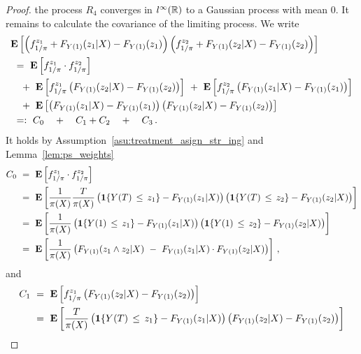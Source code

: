 \begin{proof}
the process $R_4$ converges in $l^\infty(\mathbb{R})$ to a Gaussian process with mean 0.
It remains to calculate the covariance of the limiting process.
We write
\begin{align*}
  &
  \E
  \left[
  \left( 
  f^{z_1}_{1/\pi}
  +
  F_{Y(1)}(z_1|X)
  -
F_{Y(1)}(z_1)
  \right)
  \left( 
  f^{z_2}_{1/\pi}
  +
  F_{Y(1)}(z_2|X)
  -
F_{Y(1)}(z_2)
  \right)
  \right]
  \\
  &
  \ 
  =
  \ 
\E
\left[
  f^{z_1}_{1/\pi}
  \cdot
  f^{z_2}_{1/\pi}
\right]
\\
  &
  \quad
  +
  \ 
  \E
  \left[
  f^{z_1}_{1/\pi}
  \left( 
  F_{Y(1)}(z_2|X)
  -
F_{Y(1)}(z_2)
  \right)
  \right]
  \ 
  +
  \ 
  \E
  \left[
  f^{z_2}_{1/\pi}
  \left( 
  F_{Y(1)}(z_1|X)
  -
F_{Y(1)}(z_1)
  \right)
  \right]
  \\
  &
  \quad
  +
  \ 
  \E
  \left[
  \left( 
  F_{Y(1)}(z_1|X)
  -
F_{Y(1)}(z_1)
  \right)
  \left( 
  F_{Y(1)}(z_2|X)
  -
F_{Y(1)}(z_2)
  \right)
  \right]
  \\
  &
  \ 
  =:
  \ 
  C_0
  \quad 
  +
  \quad 
  C_1
  +
  C_2
  \quad 
  +
  \quad 
  C_3
  \,.
\end{align*}
It holds
by Assumption~\eqref{asu:treatment_asign_str_ing} and Lemma~\ref{lem:ps_weights}
\begin{align*}
  C_0 
  &
  \ 
  =
  \ 
\E
\left[
  f^{z_1}_{1/\pi}
  \cdot
  f^{z_2}_{1/\pi}
\right]
\\
&
\ 
=
\ 
\E
\left[
\frac{1}{\pi(X)}
\frac{T}{\pi(X)}
\left( 
\mathbf{1}{\left\{ Y(T)\,\le\, z_1 \right\}}
-
F_{Y(1)}(z_1|X)
\right)
\left( 
\mathbf{1}{\left\{ Y(T)\,\le\, z_2 \right\}}
-
F_{Y(1)}(z_2|X)
\right)
\right]
\\
&
\ 
=
\ 
\E
\left[
\frac{1}{\pi(X)}
\left( 
\mathbf{1}{\left\{ Y(1)\,\le\, z_1 \right\}}
-
F_{Y(1)}(z_1|X)
\right)
\left( 
\mathbf{1}{\left\{ Y(1)\,\le\, z_2 \right\}}
-
F_{Y(1)}(z_2|X)
\right)
\right]
\\
&
\ 
=
\ 
\E
\left[
\frac{1}{\pi(X)}
\left( 
F_{Y(1)}(z_1\land z_2|X)
\ 
-
\ 
F_{Y(1)}(z_1|X)
\cdot
F_{Y(1)}(z_2|X)
\right)
\right]
\,,
\end{align*}
and
\begin{align*}
  C_1
  &
  \ 
  =
  \ 
 \E
  \left[
  f^{z_1}_{1/\pi}
  \left( 
  F_{Y(1)}(z_2|X)
  -
F_{Y(1)}(z_2)
  \right)
  \right]
  \\
  &
  \ 
  =
  \ 
 \E
  \left[
\frac{T}{\pi(X)}
\left( 
\mathbf{1}{\left\{ Y(T)\,\le\, z_1 \right\}}
-
F_{Y(1)}(z_1|X)
\right)
  \left( 
  F_{Y(1)}(z_2|X)
  -
F_{Y(1)}(z_2)
  \right)
  \right]
  \\

\end{align*}
\end{proof}
